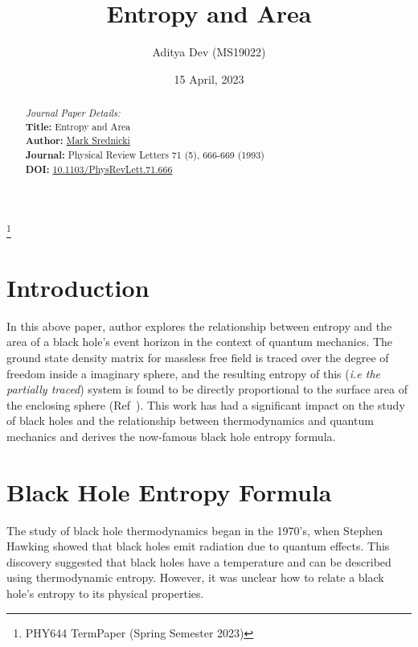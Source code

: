 \documentclass[%
 mph,%
 reprint,%
]{revtex4-2}
\begin{document}
\title[PHY644 TermPaper (Spring Semester 2023)]{Entropy and Area}
\thanks{PHY644 TermPaper (Spring Semester 2023)}

\author{Aditya Dev (MS19022) }
%



\date{15 April, 2023}%

\begin{abstract}
\centering
\textit{Journal Paper Details:} \vspace{5pt}\\ 
\textbf{Title:} Entropy and Area \\
\textbf{Author:} \href{https://web.physics.ucsb.edu/~mark/}{Mark Srednicki} \\
\textbf{Journal:} Physical Review Letters 71 (5), 666-669 (1993)\\
\textbf{DOI:}  \href{https://journals.aps.org/prl/abstract/10.1103/PhysRevLett.71.666}{10.1103/PhysRevLett.71.666}
\end{abstract}

\maketitle
\tableofcontents
\section{Introduction}
In this above paper, author explores the relationship between entropy and the area of a black hole's event horizon in the context of quantum mechanics. The ground state density matrix for massless free field is traced over the degree of freedom inside a imaginary sphere, and the resulting entropy of this (\textit{i.e the partially traced})  system is found to be directly proportional to the surface area of the enclosing sphere (Ref~). This work has had a significant impact on the study of black holes and the relationship between thermodynamics and quantum mechanics and derives the now-famous black hole entropy formula.

\section{Black Hole Entropy Formula}
The study of black hole thermodynamics began in the 1970's, when Stephen Hawking showed that black holes emit radiation due to quantum effects\cite{Hawking:1975vcx}. This discovery suggested that black holes have a temperature and can be described using thermodynamic  entropy. However, it was unclear how to relate a black hole's entropy to its physical properties.
\end{document}
